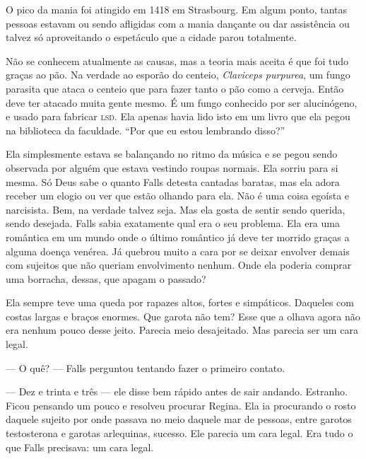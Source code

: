 O pico da mania foi atingido em 1418 em Strasbourg. Em algum ponto, tantas pessoas estavam ou sendo afligidas com a mania dançante ou  dar assistência\mudanca{,} ou talvez só aproveitando o espetáculo\mudanca{,} que a cidade parou totalmente.

Não se conhecem atualmente as causas, mas a teoria mais aceita é que foi tudo graças ao pão. Na verdade ao esporão do centeio, \emph{Claviceps purpurea}, um fungo parasita que ataca o centeio que  para fazer tanto o pão como a cerveja. Então\mudanca{,} deve ter atacado muita gente mesmo. É um fungo conhecido por ser alucinógeno, e usado para fabricar \textsc{lsd}. Ela apenas havia lido isto em um livro que ela pegou na biblioteca da faculdade. ``Por que eu estou lembrando disso?''

Ela simplesmente estava se balançando no ritmo da música e se pegou sendo observada por alguém que estava vestindo roupas normais. Ela sorriu para si mesma. Só Deus sabe o quanto Falls detesta cantadas baratas, mas ela adora receber um elogio ou ver que estão olhando para ela. Não é uma coisa egoísta e narcisista. Bem, na verdade talvez seja. Mas ela gosta de sentir sendo querida, sendo desejada. Falls sabia exatamente qual era o seu problema. Ela era uma romântica em um mundo onde o último romântico já deve ter morrido graças a alguma doença venérea. Já quebrou muito a cara por se deixar envolver demais com sujeitos que não queriam envolvimento nenhum. Onde ela poderia comprar uma borracha, dessas, que apagam o passado?

Ela sempre teve uma queda por rapazes altos, fortes e simpáticos. Daqueles com costas largas e braços enormes. Que garota não tem? Esse que a olhava agora não era nenhum pouco desse jeito. Parecia meio desajeitado. Mas parecia ser um cara legal.

--- O quê? --- Falls perguntou tentando fazer o primeiro contato.

--- Dez e trinta e três --- ele disse bem rápido\mudanca{,} antes de sair andando. Estranho. Ficou pensando um pouco e resolveu procurar Regina. Ela ia procurando o rosto daquele sujeito por onde passava\mudanca{,} no meio daquele mar de pessoas, entre garotos testosterona e garotas arlequinas,  sucesso. Ele parecia um cara legal. Era tudo o que Falls precisava: um cara legal.

